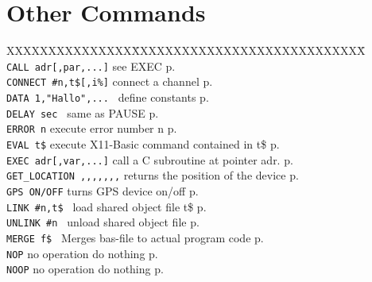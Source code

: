 \section{Other Commands}
\begin{tabbing}
XXXXXXXXXXXXXXX\=XXXXXXXXXXXXXXXXXXXXXXXXXXXX\=\kill\\

{\tt CALL adr[,par,...]} \> see EXEC\> p.\pageref{CALL}\\
\verb|CONNECT #n,t$[,i%]|\> connect a channel \> p.\pageref{CONNECT}\\
{\tt DATA 1,"Hallo",...	}\> define constants\> p.\pageref{DATA}\\
\verb|DELAY sec	|        \> same as PAUSE \> p.\pageref{DELAY}\\
\verb|ERROR n|           \> execute error number n\> p.\pageref{ERROR}\\
\verb|EVAL t$|\> execute X11-Basic command contained in t\$\> p.\pageref{EVAL}\\
{\tt EXEC adr[,var,...]}\> call a C subroutine at pointer adr.\> p.\pageref{EXEC}\\
\verb|GET_LOCATION ,,,,,,,|  \> returns the position of the device\> p.\pageref{GETiLOCATION}\\
\verb|GPS ON/OFF|  \> turns GPS device on/off             \> p.\pageref{GPS}\\
{\tt LINK \#n,t\$	}\> load shared object file t\$\> p.\pageref{LINK}\\
{\tt UNLINK \#n	}\> unload shared object file\> p.\pageref{UNLINK}\\
{\tt MERGE f\$		}\> Merges bas-file to actual program code\> p.\pageref{MERGE}\\

\verb|NOP|               \> no operation do nothing\> p.\pageref{NOP}\\
\verb|NOOP|              \> no operation do nothing\> p.\pageref{NOOP}\\


\end{tabbing}
